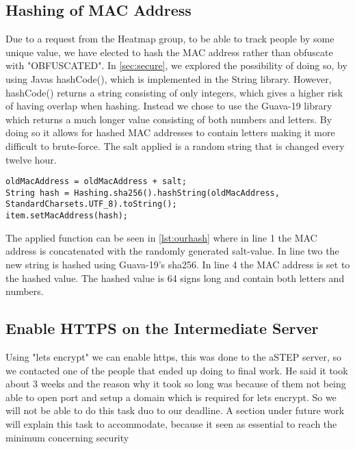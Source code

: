 \subsection*{Hashing of MAC Address}
Due to a request from the Heatmap group, to be able to track people by some unique value, we have elected to hash the MAC address rather than obfuscate with "OBFUSCATED". In \cref{sec:secure}, we explored the possibility of doing so, by using Javas hashCode(), which is implemented in the String library. However, hashCode() returns a string consisting of only integers, which gives a higher risk of having overlap when hashing. Instead we chose to use the Guava-19 library which returns a much longer value consisting of both numbers and letters. By doing so it allows for hashed MAC addresses to contain letters making it more difficult to brute-force. The salt applied is a random string that is changed every twelve hour. 

\begin{lstlisting}[caption={Hashing a MAC address},label={lst:ourhash},language=inc_Java]
oldMacAddress = oldMacAddress + salt;
String hash = Hashing.sha256().hashString(oldMacAddress, 
StandardCharsets.UTF_8).toString();
item.setMacAddress(hash);
\end{lstlisting}

The applied function can be seen in \cref{lst:ourhash} where in line 1 the MAC address is concatenated with the randomly generated salt-value. In line two the new string is hashed using Guava-19's sha256. In line 4 the MAC address is set to the hashed value. The hashed value is 64 signs long and contain both letters and numbers.


\subsection*{Enable HTTPS on the Intermediate Server}
Using "lets encrypt" we can enable https, this was done to the aSTEP server, so we contacted one of the people that ended up doing to final work. He said it took about 3 weeks and the reason why it took so long was because of them not being able to open port and setup a domain which is required for lets encrypt. So we will not be able to do this task duo to our deadline. A section under future work will explain this task to accommodate, because it seen as essential to reach the minimum concerning security